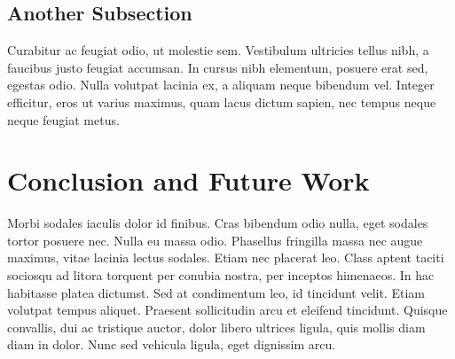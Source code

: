 \documentclass[sigconf,review,anonymous]{acmart}
\begin{document}
\subsection{Another Subsection}

Curabitur ac feugiat odio, ut molestie sem. Vestibulum ultricies tellus nibh, a faucibus justo feugiat accumsan. In cursus nibh elementum, posuere erat sed, egestas odio. Nulla volutpat lacinia ex, a aliquam neque bibendum vel. Integer efficitur, eros ut varius maximus, quam lacus dictum sapien, nec tempus neque neque feugiat metus. 

\section{Conclusion and Future Work}

Morbi sodales iaculis dolor id finibus. Cras bibendum odio nulla, eget sodales tortor posuere nec. Nulla eu massa odio. Phasellus fringilla massa nec augue maximus, vitae lacinia lectus sodales. Etiam nec placerat leo. Class aptent taciti sociosqu ad litora torquent per conubia nostra, per inceptos himenaeos. In hac habitasse platea dictumst. Sed at condimentum leo, id tincidunt velit. Etiam volutpat tempus aliquet. Praesent sollicitudin arcu et eleifend tincidunt. Quisque convallis, dui ac tristique auctor, dolor libero ultrices ligula, quis mollis diam diam in dolor. Nunc sed vehicula ligula, eget dignissim arcu.


 
\end{document}
